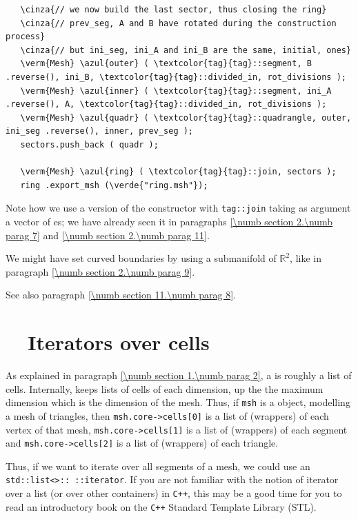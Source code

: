 \begin{Verbatim}
   \cinza{// we now build the last sector, thus closing the ring}
   \cinza{// prev_seg, A and B have rotated during the construction process}
   \cinza{// but ini_seg, ini_A and ini_B are the same, initial, ones}
   \verm{Mesh} \azul{outer} ( \textcolor{tag}{tag}::segment, B .reverse(), ini_B, \textcolor{tag}{tag}::divided_in, rot_divisions );
   \verm{Mesh} \azul{inner} ( \textcolor{tag}{tag}::segment, ini_A .reverse(), A, \textcolor{tag}{tag}::divided_in, rot_divisions );
   \verm{Mesh} \azul{quadr} ( \textcolor{tag}{tag}::quadrangle, outer, ini_seg .reverse(), inner, prev_seg );
   sectors.push_back ( quadr );
   
   \verm{Mesh} \azul{ring} ( \textcolor{tag}{tag}::join, sectors );
   ring .export_msh (\verde{"ring.msh"});
\end{Verbatim}

Note how we use a version of the {\small\tt {}} constructor with {\small\tt \textcolor{tag}{tag}::join}
taking as argument a vector of {\small\tt {}}es; we have already seen it in paragraphs
\ref{\numb section 2.\numb parag 7} and \ref{\numb section 2.\numb parag 11}.

We might have set curved boundaries by using a submanifold of $ \mathbb{R}^2 $, like in paragraph
\ref{\numb section 2.\numb parag 9}.

See also paragraph \ref{\numb section 11.\numb parag 8}.


\section{~~Iterators over cells}\label{\numb section 9.\numb parag 3}

As explained in paragraph \ref{\numb section 1.\numb parag 2}, a {\small\tt {}} is
roughly a list of cells.
Internally, {\maniFEM} keeps lists of cells of each dimension, up the the maximum
dimension which is the dimension of the mesh.
Thus, if {\small\tt msh} is a {\small\tt {}} object, modelling a
mesh of triangles, then {\small\tt msh.core->cells[0]} is a list of (wrappers) of
each vertex of that mesh, {\small\tt msh.core->cells[1]} is a list of (wrappers) of
each segment and {\small\tt msh.core->cells[2]} is a list of (wrappers) of each triangle.

Thus, if we want to iterate over all segments of a mesh, we could use an
{\small\tt std::list<>:: ::iterator}.
If you are not familiar with the notion of iterator over a list (or over other containers)
in {\tt C++}, this may be a good time for you to read an introductory book on the
{\tt C++} Standard Template Library (STL).

